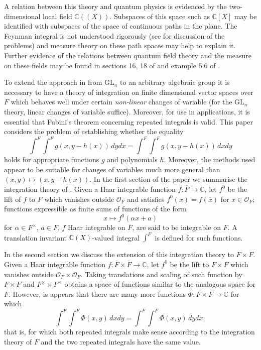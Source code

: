 \documentclass{lmsMODIFIED}
\newcommand{\bb}[1]{\mathbb{#1}}
\newcommand{\roi}{\mathcal{O}}
\newcommand{\res}[1]{\overline{#1}}
\newcommand{\al}{\alpha}
\newcommand{\mult}[1]{#1^{\times}}
\begin{document}
A relation between this theory and quantum physics is evidenced by the two-dimensional local field $\bb{C}((X))$. Subspaces of this space such as $\bb{C}[X]$ may be identified with subspaces of the space of continuous paths in the plane. The Feynman integral is not understood rigorously (see \cite{Johnson2000} for discussion of the problems) and measure theory on these path spaces may help to explain it. Further evidence of the relations between quantum field theory and the measure on these fields may be found in sections 16, 18 of \cite{Fesenko2006} and example 5.6 of \cite{Morrow2008}.

To extend the approach in \cite{Morrow2008a} from $\mbox{GL}_n$ to an arbitrary algebraic group it is necessary to have a theory of integration on finite dimensional vector spaces over $F$ which behaves well under certain \emph{non-linear} changes of variable (for the $\mbox{GL}_n$ theory, linear changes of variable suffice). Moreover, for use in applications, it is essential that Fubini's theorem concerning repeated integrals is valid. This paper considers the problem of establishing whether the equality \[\int^F\int^F g(x,y-h(x))\,dydx=\int^F\int^F g(x,y-h(x))\,dxdy\] holds for appropriate functions $g$ and polynomials $h$. Moreover, the methods used appear to be suitable for changes of variables much more general than $(x,y)\mapsto (x,y-h(x))$.
In the first section of the paper we summarise the integration theory of \cite{Morrow2008}. Given a Haar integrable function $f:\res{F}\to\bb{C}$, let $f^0$ be the lift of $f$ to $F$ which vanishes outside $\roi_{F}$ and satisfies $f^0(x)=f(\res{x})$ for $x\in\roi_{F}$; functions expressible as finite sums of functions of the form \[x\mapsto f^0(\al x+a)\] for $\al\in\mult{F}$, $a\in F$, $f$ Haar integrable on $\res{F}$, are said to be integrable on $F$. A translation invariant $\bb{C}(X)$-valued integral $\int^F$ is defined for such functions.

In the second section we discuss the extension of this integration theory to $F\times F$. Given a Haar integrable function $f:\res{F}\times\res{F}\to\bb{C}$, let $f^0$ be the lift to $F\times F$ which vanishes outside $\roi_{F}\times\roi_{F}$. Taking translations and scaling of such function by $F\times F$ and $\mult{F}\times\mult{F}$ obtains a space of functions similar to the analogous space for $F$. However, is appears that there are many more functions $\Phi:F\times F\to \bb{C}$ for which \[\int^F\int^F\Phi(x,y)\,dxdy=\int^F\int^F\Phi(x,y)\,dydx;\] that is, for which both repeated integrals make sense according to the integration theory of $F$ and the two repeated integrals have the same value.
\end{document}

